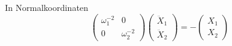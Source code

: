 \documentclass[12pt,compress]{beamer}
\begin{document}
{{    \vfill

    In Normalkoordinaten
    \begin{equation}
    \nonumber
    \begin{pmatrix}
    \omega_1^{-2} & 0 \\
    0 & \omega_2^{-2}
    \end{pmatrix}
    \begin{pmatrix}
    \ddot X_1 \\ \ddot X_2
    \end{pmatrix} =
    -\begin{pmatrix}
    X_1 \\ X_2
    \end{pmatrix}
    \end{equation}
    }
}

\end{document}
